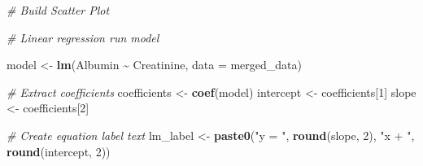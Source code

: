 \documentclass[
]{article}
\newenvironment{Shaded}{\begin{snugshade}}{\end{snugshade}}
\newcommand{\AttributeTok}[1]{\textcolor[rgb]{0.13,0.29,0.53}{#1}}
\newcommand{\CommentTok}[1]{\textcolor[rgb]{0.56,0.35,0.01}{\textit{#1}}}
\newcommand{\DecValTok}[1]{\textcolor[rgb]{0.00,0.00,0.81}{#1}}
\newcommand{\FunctionTok}[1]{\textcolor[rgb]{0.13,0.29,0.53}{\textbf{#1}}}
\newcommand{\NormalTok}[1]{#1}
\newcommand{\OtherTok}[1]{\textcolor[rgb]{0.56,0.35,0.01}{#1}}
\newcommand{\SpecialCharTok}[1]{\textcolor[rgb]{0.81,0.36,0.00}{\textbf{#1}}}
\newcommand{\StringTok}[1]{\textcolor[rgb]{0.31,0.60,0.02}{#1}}
\begin{document}
\begin{Shaded}
\begin{Highlighting}[]
\CommentTok{\# Build Scatter Plot}


\CommentTok{\# Linear regression run model }

\NormalTok{model }\OtherTok{\textless{}{-}} \FunctionTok{lm}\NormalTok{(Albumin }\SpecialCharTok{\textasciitilde{}}\NormalTok{ Creatinine, }\AttributeTok{data =}\NormalTok{ merged\_data) }

\CommentTok{\# Extract coefficients}
\NormalTok{coefficients }\OtherTok{\textless{}{-}} \FunctionTok{coef}\NormalTok{(model)}
\NormalTok{intercept }\OtherTok{\textless{}{-}}\NormalTok{ coefficients[}\DecValTok{1}\NormalTok{]}
\NormalTok{slope }\OtherTok{\textless{}{-}}\NormalTok{ coefficients[}\DecValTok{2}\NormalTok{]}

\CommentTok{\# Create equation label text}
\NormalTok{lm\_label }\OtherTok{\textless{}{-}} \FunctionTok{paste0}\NormalTok{(}\StringTok{"y = "}\NormalTok{, }\FunctionTok{round}\NormalTok{(slope, }\DecValTok{2}\NormalTok{), }\StringTok{"x + "}\NormalTok{, }\FunctionTok{round}\NormalTok{(intercept, }\DecValTok{2}\NormalTok{))}


\end{Highlighting}
\end{Shaded}
\end{document}
